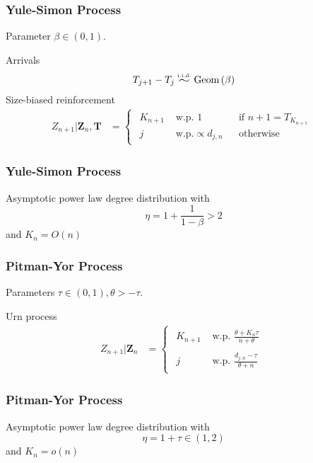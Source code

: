\documentclass[final,hyperref={pdfpagelabels=false},noamsthm]{beamer}
\newcommand{\ee}{Z} %
\newcommand{\bfee}{\mathbf{\ee}}
\newcommand{\bfT}{\mathbf{T}}
\newcommand{\simiid}{\overset{\scriptscriptstyle{\text{i.i.d.}}}{\widesim}}
\newcommand{\widesim}[1][1.5]{
	\mathrel{\scalebox{#1}[1]{$\sim$}}
}
\begin{document}
\begin{frame}
	\frametitle{Yule-Simon Process}
	Parameter $\beta \in (0, 1)$.
	\vspace{15pt}
	
	Arrivals
	\begin{align}
	T_{j+1} - T_{j} \simiid \text{Geom}\left( \beta \right)
	\end{align}
	Size-biased reinforcement
	\begin{align} 
	\ee_{n+1} | \bfee_{n}, \bfT &= \begin{cases}\begin{aligned}
	K_{n+1} & \text{ w.p. } 1 && \text{if } n+1 = T_{K_{n+1}} \\
	j &\text{ w.p.} \propto d_{j,n} && \text{otherwise} 
	\end{aligned}\end{cases}
	\label{eq:ys}
	\end{align}
\end{frame}

\begin{frame}
	\frametitle{Yule-Simon Process}
	Asymptotic power law degree distribution with
	\begin{equation*}
		\eta = 1 + \frac{1}{1-\beta} > 2
	\end{equation*}
	and $K_n = O(n)$
\end{frame}

\begin{frame}
	\frametitle{Pitman-Yor Process}
	Parameters $\tau \in (0, 1), \theta > -\tau$.
	\vspace{15pt}
	
	Urn process
	\begin{align} 
	\ee_{n+1} | \bfee_{n} &= \begin{cases}\begin{aligned}
	K_{n+1} & \text{ w.p. } \frac{\theta + K_n \tau}{n + \theta}  \\
	& \\
	j &\text{ w.p. } \frac{d_{j,n} - \tau}{\theta + n} 
	\end{aligned}\end{cases}
	\label{eq:pyp1}
	\end{align}
\end{frame}

\begin{frame}
	\frametitle{Pitman-Yor Process}
	Asymptotic power law degree distribution with
	\begin{equation*}
		\eta = 1 + \tau \in (1, 2)
	\end{equation*}
	and $K_n = o(n)$
\end{frame}
\end{document}
